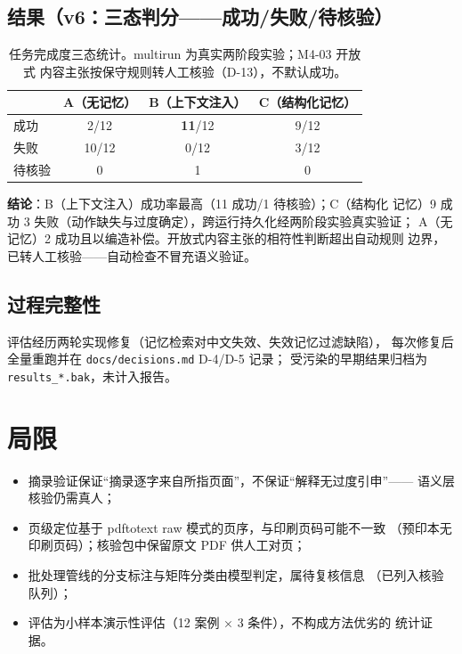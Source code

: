 \documentclass[UTF8, a4paper, zihao=-4]{ctexart}
\begin{document}
\subsection{结果（v6：三态判分——成功/失败/待核验）}

\begin{table}[h]
\centering
\begin{tabular}{lccc}
\toprule
 & A（无记忆） & B（上下文注入） & C（结构化记忆） \\
\midrule
成功 & 2/12 & \textbf{11}/12 & 9/12 \\
失败 & 10/12 & 0/12 & 3/12 \\
待核验 & 0 & 1 & 0 \\
\bottomrule
\end{tabular}
\caption{任务完成度三态统计。multirun 为真实两阶段实验；M4-03 开放式
内容主张按保守规则转人工核验（D-13），不默认成功。}
\end{table}

\textbf{结论}：B（上下文注入）成功率最高（11 成功/1 待核验）；C（结构化
记忆）9 成功 3 失败（动作缺失与过度确定），跨运行持久化经两阶段实验真实验证；
A（无记忆）2 成功且以编造补偿。开放式内容主张的相符性判断超出自动规则
边界，已转人工核验——自动检查不冒充语义验证。

\subsection{过程完整性}

评估经历两轮实现修复（记忆检索对中文失效、失效记忆过滤缺陷），
每次修复后全量重跑并在 \texttt{docs/decisions.md} D-4/D-5 记录；
受污染的早期结果归档为 \texttt{results\_*.bak}，未计入报告。

\section{局限}

\begin{itemize}
  \item 摘录验证保证``摘录逐字来自所指页面''，不保证``解释无过度引申''——
        语义层核验仍需真人；
  \item 页级定位基于 pdftotext raw 模式的页序，与印刷页码可能不一致
        （预印本无印刷页码）；核验包中保留原文 PDF 供人工对页；
  \item 批处理管线的分支标注与矩阵分类由模型判定，属待复核信息
        （已列入核验队列）；
  \item 评估为小样本演示性评估（12 案例 × 3 条件），不构成方法优劣的
        统计证据。
\end{itemize}
\end{document}
